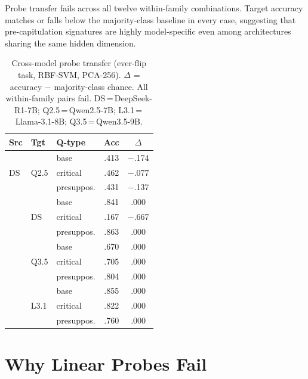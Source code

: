 \documentclass[11pt]{article}
\begin{document}
Probe transfer fails across all twelve within-family combinations.
Target accuracy matches or falls below the majority-class baseline in
every case, suggesting that pre-capitulation signatures are highly
model-specific even among architectures sharing the same hidden dimension.


 \begin{table}[t]
  \centering
  \small
  \setlength{\tabcolsep}{4pt}
  \caption{Cross-model probe transfer (ever-flip task, RBF-SVM, PCA-256).
    $\Delta$ = accuracy $-$ majority-class chance. All within-family pairs fail.
    DS\,=\,DeepSeek-R1-7B; Q2.5\,=\,Qwen2.5-7B;
    L3.1\,=\,Llama-3.1-8B; Q3.5\,=\,Qwen3.5-9B.}
  \label{tab:transfer}
  \begin{tabular}{@{}llp{1.5cm}cc@{}}
  \toprule
  Src & Tgt & Q-type & Acc & $\Delta$ \\
  \midrule
  \multirow{3}{*}{DS}   & \multirow{3}{*}{Q2.5}
    & base        & .413 & $-$.174 \\
    &             & critical    & .462 & $-$.077 \\
    &             & presuppos.  & .431 & $-$.137 \\
  \addlinespace
  \multirow{3}{*}{Q2.5} & \multirow{3}{*}{DS}
    & base        & .841 & \phantom{$-$}.000 \\
    &             & critical    & .167 & $-$.667 \\
    &             & presuppos.  & .863 & \phantom{$-$}.000 \\
  \addlinespace
  \multirow{3}{*}{L3.1} & \multirow{3}{*}{Q3.5}
    & base        & .670 & \phantom{$-$}.000 \\
    &             & critical    & .705 & \phantom{$-$}.000 \\
    &             & presuppos.  & .804 & \phantom{$-$}.000 \\
  \addlinespace
  \multirow{3}{*}{Q3.5} & \multirow{3}{*}{L3.1}
    & base        & .855 & \phantom{$-$}.000 \\
    &             & critical    & .822 & \phantom{$-$}.000 \\
    &             & presuppos.  & .760 & \phantom{$-$}.000 \\
  \bottomrule
  \end{tabular}
  \end{table}


\section{Why Linear Probes Fail}
\label{appendix:linear}
\end{document}
